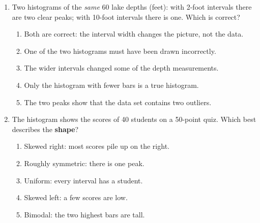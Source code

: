 \documentclass[12pt]{article}
\newenvironment{choices}
  {\begin{enumerate}[label=\textbf{(\Alph*)}, leftmargin=2.2em, itemsep=0pt, topsep=1pt]}
  {\end{enumerate}}
\newcommand{\letterroom}{\rule[-15pt]{0pt}{36pt}}
\begin{document}
\begin{enumerate}[leftmargin=1.9em, itemsep=0.03in]
  \boxguard[10]
  \item Two histograms of the \emph{same} 60 lake depths (feet): with 2-foot intervals there are
        two clear peaks; with 10-foot intervals there is one. Which is correct?
        \begin{choices}
          \item Both are correct: the interval width changes the picture, not the data.
          \item One of the two histograms must have been drawn incorrectly.
          \item The wider intervals changed some of the depth measurements.
          \item Only the histogram with fewer bars is a true histogram.
          \item The two peaks show that the data set contains two outliers.
                \hfill{}\letterroom
        \end{choices}

  \boxguard[11]
  \item \begin{minipage}[t]{0.56\linewidth}\raggedright
        The histogram shows the scores of 40 students on a 50-point quiz. Which best describes
        the \textbf{shape}?
        \begin{choices}
          \item Skewed right: most scores pile up on the right.
          \item Roughly symmetric: there is one peak.
          \item Uniform: every interval has a student.
          \item Skewed left: a few scores are low.
          \item Bimodal: the two highest bars are tall.
        \end{choices}
        \end{minipage}\hfill
        \begin{minipage}[t]{0.40\linewidth}
        \centering
        \end{minipage}


\end{enumerate}
\end{document}
